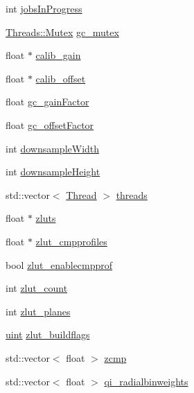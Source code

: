 \begin{DoxyCompactItemize}
\item 
int \hyperlink{class_queued_c_p_u_tracker_a8436603ae463b99b2bfb1797f5a6003a}{jobs\+In\+Progress}
\item 
\hyperlink{struct_threads_1_1_mutex}{Threads\+::\+Mutex} \hyperlink{class_queued_c_p_u_tracker_aa132b16144343a84589cf8b5318f07b0}{gc\+\_\+mutex}
\item 
float $\ast$ \hyperlink{class_queued_c_p_u_tracker_a5a9273673ed2fe05c97a82be8052eb7e}{calib\+\_\+gain}
\item 
float $\ast$ \hyperlink{class_queued_c_p_u_tracker_a4bc0b00839380716cd7a94e8593acc90}{calib\+\_\+offset}
\item 
float \hyperlink{class_queued_c_p_u_tracker_a286e6579f5a35ad2b1b935bb473621b5}{gc\+\_\+gain\+Factor}
\item 
float \hyperlink{class_queued_c_p_u_tracker_a0b88b6b96bb6afa945383bf1dc2a764d}{gc\+\_\+offset\+Factor}
\item 
int \hyperlink{class_queued_c_p_u_tracker_a61d134a809e2c7917be42af542922870}{downsample\+Width}
\item 
int \hyperlink{class_queued_c_p_u_tracker_aa4819d54f418b04de8da8a14b8a9af7d}{downsample\+Height}
\item 
std\+::vector$<$ \hyperlink{struct_queued_c_p_u_tracker_1_1_thread}{Thread} $>$ \hyperlink{class_queued_c_p_u_tracker_a27aba85759ba549ea77db9754722e318}{threads}
\item 
float $\ast$ \hyperlink{class_queued_c_p_u_tracker_a1bad88f56b12ea8de35879acd07f4c8e}{zluts}
\item 
float $\ast$ \hyperlink{class_queued_c_p_u_tracker_af196deebd0dca3e532f248c02964c366}{zlut\+\_\+cmpprofiles}
\item 
bool \hyperlink{class_queued_c_p_u_tracker_a533b617109af0be5d7b8634e947119d8}{zlut\+\_\+enablecmpprof}
\item 
int \hyperlink{class_queued_c_p_u_tracker_a2848d660cb1607f7bd135fd821dd8108}{zlut\+\_\+count}
\item 
int \hyperlink{class_queued_c_p_u_tracker_a4287f68021755bcf62e4ddf9b8b48215}{zlut\+\_\+planes}
\item 
\hyperlink{std__incl_8h_a91ad9478d81a7aaf2593e8d9c3d06a14}{uint} \hyperlink{class_queued_c_p_u_tracker_a2f1c56ea335981c9a9ae0756b84931ce}{zlut\+\_\+buildflags}
\item 
std\+::vector$<$ float $>$ \hyperlink{class_queued_c_p_u_tracker_a318963eb81d408fa2d94335448b8207c}{zcmp}
\item 
std\+::vector$<$ float $>$ \hyperlink{class_queued_c_p_u_tracker_ab770ea114960e88426fa030cb93ea3c1}{qi\+\_\+radialbinweights}

\end{DoxyCompactItemize}
